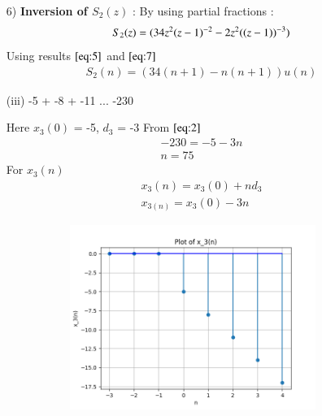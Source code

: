 \documentclass[journal,12pt,twocolumn]{IEEEtran}
\theoremstyle{remark}
\begin{document}
\begin{enumerate}
    \item[6)]
\textbf{Inversion of $S_2(z)$} :
By using partial fractions :
\begin{align}
    S_2(z) = \notag(34z^2(z-1)^{-2} - 2z^2((z-1))^{-3}) 
\end{align}
Using results $\eqref{eq:5}$ and $\eqref{eq:7}$
\begin{align}
 S_2(n) = (34(n+1) - n(n+1))u(n)   
\end{align}

\vspace{1cm}
 
\vspace{0.5cm}
\item[(iii)]
-5 + -8 + -11 ... -230\vspace{0.05cm}
\vspace{0.2cm}

Here $x_3(0)$ = -5, $d_3$ = -3\vspace{0.05cm}
From $\eqref{eq:2}$
\begin{align}
-230= -5 -3n \\
n=75
\end{align}
For $x_3(n)$
\begin{align}
x_3(n) = x_3(0) + nd_3\\
x_{3(n)}=x_3(0) - 3n
\end{align}

\begin{figure}[!ht]   
\centering
\graphicspath{ {figs/} }
\includegraphics[width=10cm, height=6cm]{graph_3}
\captionsetup{Graph:3 $x_3(n)$ vs n }
\label{graph:4}
\end{figure}


\end{enumerate}
\end{document}
